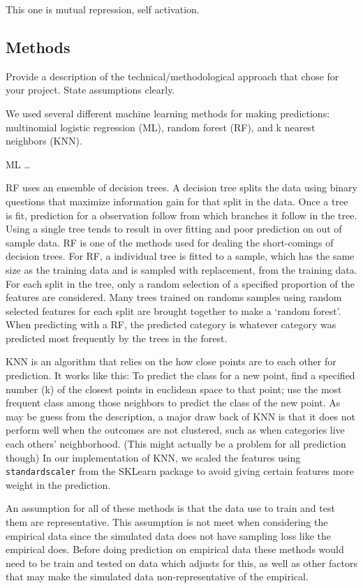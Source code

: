 \documentclass[
]{article}
\begin{document}
This one is mutual repression, self activation.

\hypertarget{methods}{%
\subsection{Methods}\label{methods}}

Provide a description of the technical/methodological approach that
chose for your project. State assumptions clearly.

We used several different machine learning methods for making
predictions: multinomial logistic regression (ML), random forest (RF),
and k nearest neighbors (KNN).

ML \ldots{}

RF uses an ensemble of decision trees. A decision tree splits the data
using binary questions that maximize information gain for that split in
the data. Once a tree is fit, prediction for a observation follow from
which branches it follow in the tree. Using a single tree tends to
result in over fitting and poor prediction on out of sample data. RF is
one of the methods used for dealing the short-comings of decision trees.
For RF, a individual tree is fitted to a sample, which has the same size
as the training data and is sampled with replacement, from the training
data. For each split in the tree, only a random selection of a specified
proportion of the features are considered. Many trees trained on randoms
samples using random selected features for each split are brought
together to make a `random forest'. When predicting with a RF, the
predicted category is whatever category was predicted most frequently by
the trees in the forest.

KNN is an algorithm that relies on the how close points are to each
other for prediction. It works like this: To predict the class for a new
point, find a specified number (k) of the closest points in euclidean
space to that point; use the most frequent class among those neighbors
to predict the class of the new point. As may be guess from the
description, a major draw back of KNN is that it does not perform well
when the outcomes are not clustered, such as when categories live each
others' neighborhood. (This might actually be a problem for all
prediction though) In our implementation of KNN, we scaled the features
using \texttt{standardscaler} from the SKLearn package to avoid giving
certain features more weight in the prediction.

An assumption for all of these methods is that the data use to train and
test them are representative. This assumption is not meet when
considering the empirical data since the simulated data does not have
sampling loss like the empirical does. Before doing prediction on
empirical data these methods would need to be train and tested on data
which adjusts for this, as well as other factors that may make the
simulated data non-representative of the empirical.
\end{document}
